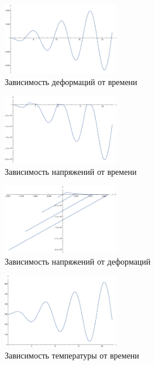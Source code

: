 \documentclass[unicode, 8pt]{beamer}
\begin{document}
    \begin{frame}
        \begin{figure}
            \centering
            \includegraphics[width=0.45\textwidth]{T1/h_1_tau_0.05/epsilon(t).pdf}
            \caption{Зависимость деформаций от времени}
        \end{figure}

        \begin{figure}
                \centering
                \includegraphics[width=0.45\textwidth]{T1/h_1_tau_0.05/sigma(t).pdf}
                \caption{Зависимость напряжений от времени}
       \end{figure}
    \end{frame}

    \begin{frame}
        \begin{figure}
            \centering
            \includegraphics[width=0.45\textwidth]{T1/h_1_tau_0.05/sigma(epsilon).pdf}
            \caption{Зависимость напряжений от деформаций}
        \end{figure}

        \begin{figure}
                \centering
                \includegraphics[width=0.45\textwidth]{T1/h_1_tau_0.05/T(t).pdf}
                \caption{Зависимость температуры от времени}
       \end{figure}
    \end{frame}
    
\end{document}

